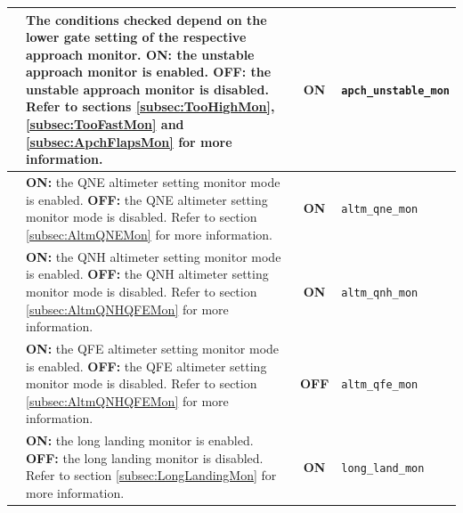 \documentclass[a4paper,12pt]{article}
\newcommand{\confopt}[1]{\texttt{#1}}
\begin{document}
{\begin{center}
\begin{supertabular}{|c|p{8cm}|c|l|}
\hline

 &
The conditions checked depend on the lower gate setting of the respective
approach monitor.\newline
\textbf{ON:} the unstable approach monitor is enabled.\newline
\textbf{OFF:} the unstable approach monitor is disabled.\newline
Refer to sections \ref{subsec:TooHighMon}, \ref{subsec:TooFastMon} and
\ref{subsec:ApchFlapsMon} for more information. & \textbf{ON} &
\confopt{apch\_unstable\_mon} \\

\hline

 &
\textbf{ON:} the QNE altimeter setting monitor mode is enabled.\newline
\textbf{OFF:} the QNE altimeter setting monitor mode is disabled.\newline
Refer to section \ref{subsec:AltmQNEMon} for more information. &
\textbf{ON} & \confopt{altm\_qne\_mon} \\

\hline

 &
\textbf{ON:} the QNH altimeter setting monitor mode is enabled.\newline
\textbf{OFF:} the QNH altimeter setting monitor mode is disabled.\newline
Refer to section \ref{subsec:AltmQNHQFEMon} for more information. &
\textbf{ON} & \confopt{altm\_qnh\_mon} \\

\hline

 &
\textbf{ON:} the QFE altimeter setting monitor mode is enabled.\newline
\textbf{OFF:} the QFE altimeter setting monitor mode is disabled.\newline
Refer to section \ref{subsec:AltmQNHQFEMon} for more information. &
\textbf{OFF} & \confopt{altm\_qfe\_mon} \\

\hline

 &
\textbf{ON:} the long landing monitor is enabled.\newline
\textbf{OFF:} the long landing monitor is disabled.\newline
Refer to section \ref{subsec:LongLandingMon} for more information. &
\textbf{ON} & \confopt{long\_land\_mon} \\

\hline


\end{supertabular}
\end{center}}
\end{document}
